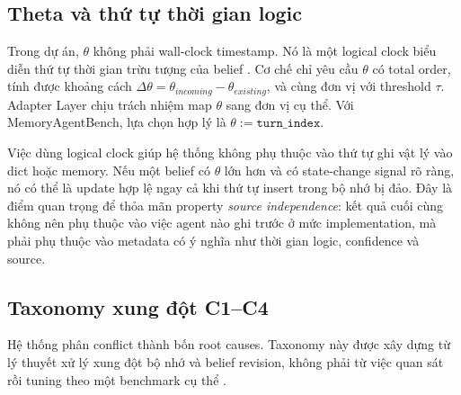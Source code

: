 \documentclass[12pt,a4paper]{article}
\begin{document}
\subsection{Theta và thứ tự thời gian logic}

Trong dự án, \(\theta\) không phải wall-clock timestamp. Nó là một logical clock biểu diễn thứ tự thời gian trừu tượng của belief \cite{lamport1978}. Cơ chế chỉ yêu cầu \(\theta\) có total order, tính được khoảng cách \(\Delta\theta = \theta_{incoming} - \theta_{existing}\), và cùng đơn vị với threshold \(\tau\). Adapter Layer chịu trách nhiệm map \(\theta\) sang đơn vị cụ thể. Với MemoryAgentBench, lựa chọn hợp lý là \(\theta := \texttt{turn\_index}\).

Việc dùng logical clock giúp hệ thống không phụ thuộc vào thứ tự ghi vật lý vào dict hoặc memory. Nếu một belief có \(\theta\) lớn hơn và có state-change signal rõ ràng, nó có thể là update hợp lệ ngay cả khi thứ tự insert trong bộ nhớ bị đảo. Đây là điểm quan trọng để thỏa mãn property \textit{source independence}: kết quả cuối cùng không nên phụ thuộc vào việc agent nào ghi trước ở mức implementation, mà phải phụ thuộc vào metadata có ý nghĩa như thời gian logic, confidence và source.

\subsection{Taxonomy xung đột C1--C4}

Hệ thống phân conflict thành bốn root causes. Taxonomy này được xây dựng từ lý thuyết xử lý xung đột bộ nhớ và belief revision, không phải từ việc quan sát rồi tuning theo một benchmark cụ thể \cite{agm1985,doyle1979}.

\begin{table}[H]
\centering
\caption{Taxonomy C1--C4 của conflict trong shared memory.}
\label{tab:c1c4}
\end{table}
\end{document}
